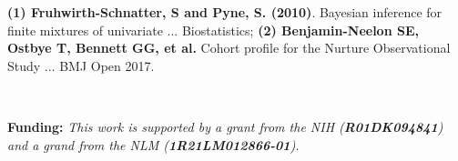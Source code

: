 \documentclass[final]{beamer}
\newlength{\onecolwid}
\begin{document}
\begin{frame}[t]
\begin{columns}[t]
\begin{column}{\onecolwid}
\tiny  \textbf{(1) Fruhwirth-Schnatter, S and Pyne, S. (2010)}. Bayesian inference for finite mixtures of univariate ... Biostatistics; \textbf{(2) Benjamin-Neelon SE, Ostbye T, Bennett GG, et al.} Cohort profile for the Nurture Observational Study ... BMJ Open 2017.

\

\tiny \textbf{Funding:} \textit{This work is supported by a grant from the NIH (\textbf{R01DK094841}) and a grand from the NLM (\textbf{1R21LM012866-01})}.





\end{column} %

\end{columns} %

\end{frame} %
\end{document}
